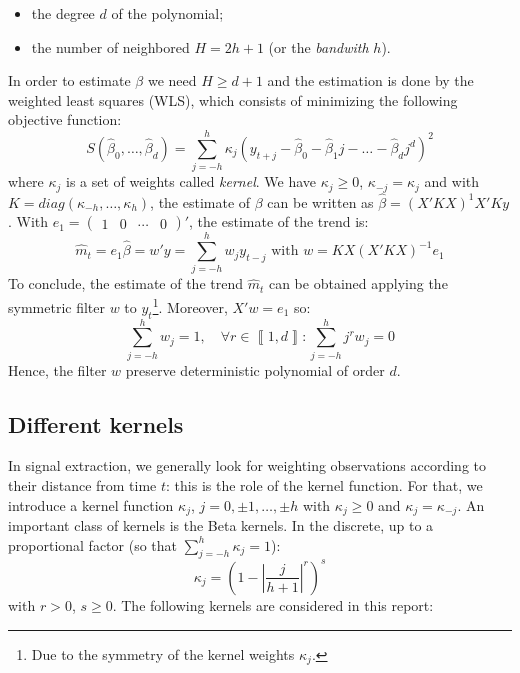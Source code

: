 \documentclass[
  12pt,
  ,
  a4paper]{article}
\newcommand\1{\mathds{1}}
\begin{document}
\begin{itemize}
\item
  the degree \(d\) of the polynomial;
\item
  the number of neighbored \(H=2h+1\) (or the \emph{bandwith} \(h\)).
\end{itemize}

In order to estimate \(\beta\) we need \(H\geq d+1\) and the estimation is done by the weighted least squares (WLS), which consists of minimizing the following objective function:
\[
S(\hat{\beta}_{0},\dots,\hat{\beta}_{d})=\sum_{j=-h}^{h}\kappa_{j}(y_{t+j}-\hat{\beta}_{0}-\hat{\beta}_{1}j-\dots-\hat{\beta}_{d}j^{d})^{2}
\]
where \(\kappa_j\) is a set of weights called \emph{kernel}. We have \(\kappa_j\geq 0\), \(\kappa_{-j}=\kappa_j\) and with \(K=diag(\kappa_{-h},\dots,\kappa_{h})\), the estimate of \(\beta\) can be written as \(\hat{\beta}=(X'KX)^{1}X'Ky\).
With \(e_{1}=\begin{pmatrix}1&0&\cdots&0\end{pmatrix}'\), the estimate of the trend is:
\[
\hat{m}_{t}=e_{1}\hat{\beta}=w'y=\sum_{j=-h}^{h}w_{j}y_{t-j}\text{ with }w=KX(X'KX)^{-1}e_{1}
\]
To conclude, the estimate of the trend \(\hat{m}_{t}\) can be obtained applying the symmetric filter \(w\) to \(y_t\)\footnote{Due to the symmetry of the kernel weights \(\kappa_j\).}.
Moreover, \(X'w=e_{1}\) so:
\[
\sum_{j=-h}^{h}w_{j}=1,\quad\forall r\in\left\llbracket 1,d\right\rrbracket :\sum_{j=-h}^{h}j^{r}w_{j}=0
\]
Hence, the filter \(w\) preserve deterministic polynomial of order \(d\).

\hypertarget{sec:kernels}{%
\subsection{Different kernels}\label{sec:kernels}}

In signal extraction, we generally look for weighting observations according to their distance from time \(t\): this is the role of the kernel function.
For that, we introduce a kernel function \(\kappa_j\), \(j=0,\pm1,\dots,\pm h\) with \(\kappa_j \geq0\) and \(\kappa_j=\kappa_{-j}\).
An important class of kernels is the Beta kernels. In the discrete, up to a proportional factor (so that \(\sum_{j=-h}^h\kappa_j=1\)):
\[
\kappa_j = \left(
  1-
  \left\lvert
  \frac j {h+1}
  \right\lvert^r
\right)^s
\]
with \(r>0\), \(s\geq 0\). The following kernels are considered in this report:
\end{document}
